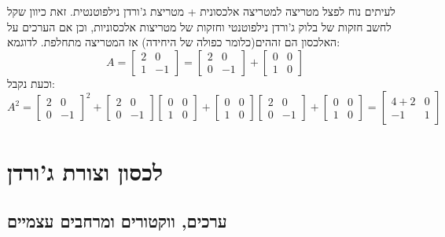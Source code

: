 \documentclass{tstextbook}
\begin{document}
\begin{remark}
לעיתים נוח לפצל מטריצה למטריצה אלכסונית + מטריצת ג'ורדן נילפוטנטית. זאת כיוון שקל לחשב חזקות של בלוק ג'ורדן נילפוטנטי וחזקות של מטריצות אלכסוניות, וכן אם הערכים על האלכסון הם זההים(כלומר כפולה של היחידה) אז המטריצה מתחלפת. לדוגמא:
$$A=\begin{bmatrix}2 & 0 \\1 & -1\end{bmatrix}=\begin{bmatrix}2 & 0 \\0 & -1\end{bmatrix}+\begin{bmatrix}0 & 0 \\1 & 0
\end{bmatrix}$$
וכעת נקבל:
$$A^{2}=\begin{bmatrix}2 & 0 \\0 & -1 \end{bmatrix}^{2}+\begin{bmatrix}2 & 0 \\0 & -1\end{bmatrix}\begin{bmatrix}0 & 0 \\1 & 0\end{bmatrix}+\begin{bmatrix}0 & 0 \\1 & 0\end{bmatrix}\begin{bmatrix}2 & 0 \\0 & -1\end{bmatrix}+\begin{bmatrix}0 & 0 \\1 & 0\end{bmatrix}=\begin{bmatrix}4+2 & 0 \\-1 & 1
\end{bmatrix}$$

\end{remark}
\section{לכסון וצורת ג'ורדן}

\subsection{ערכים, ווקטורים ומרחבים עצמיים}
\end{document}
